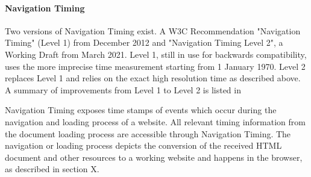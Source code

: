 









\paragraph{Navigation Timing}



Two versions of Navigation Timing exist.
A W3C Recommendation "Navigation Timing" (Level 1) from December 2012 %
and "Navigation Timing Level 2", a Working Draft from March 2021. %
Level 1, still in use for backwards compatibility, uses the more imprecise time measurement starting from 1 January 1970.
Level 2 replaces Level 1 and relies on the exact high resolution time as described above.
A summary of improvements from Level 1 to Level 2 is listed in %





Navigation Timing exposes time stamps of events which occur during the navigation and loading process of a website.
All relevant timing information from the document loading process are accessible through Navigation Timing.
The navigation or loading process depicts the conversion of the received HTML document and other resources to a working website and happens in the browser, as described in section X. %

